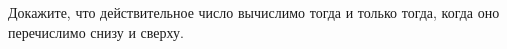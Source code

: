 Докажите, что действительное число вычислимо тогда и только тогда, когда оно перечислимо снизу и сверху.
